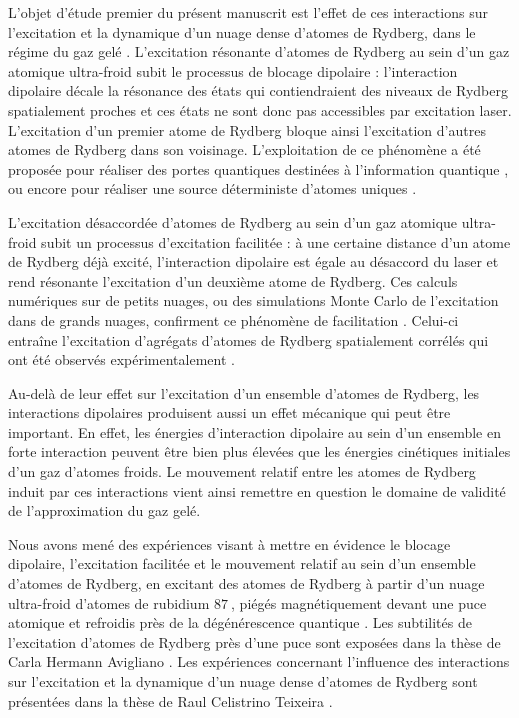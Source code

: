 \bigskip

L'objet d'étude premier du présent manuscrit est l'effet de ces interactions sur l'excitation et la dynamique d'un nuage dense d'atomes de Rydberg, dans le régime du \og gaz gelé \fg{}.
L'excitation résonante d'atomes de Rydberg au sein d'un gaz atomique ultra-froid subit le processus de \og blocage dipolaire \fg{} \cite{Lukin2001} :
l'interaction dipolaire décale la résonance des états qui contiendraient des niveaux de Rydberg spatialement proches et ces états ne sont donc pas accessibles par excitation laser.
L'excitation d'un premier atome de Rydberg bloque ainsi l'excitation d'autres atomes de Rydberg dans son voisinage.
L'exploitation de ce phénomène a été proposée pour réaliser des portes quantiques destinées à l'information quantique \cite{Lukin2001,Lukin2000b,Saffman2010}, ou encore pour réaliser une source déterministe d'atomes uniques \cite{Saffman2002}.

L'excitation désaccordée d'atomes de Rydberg au sein d'un gaz atomique ultra-froid subit un processus d'\og excitation facilitée \fg{} :
à une certaine distance d'un atome de Rydberg déjà excité, l'interaction dipolaire est égale au désaccord du laser et rend résonante l'excitation d'un deuxième atome de Rydberg.
Ces calculs numériques sur de petits nuages, ou des simulations Monte Carlo de l'excitation dans de grands nuages, confirment ce phénomène de facilitation \cite{Robicheaux2005,Rost2007a,Evers2013,Cote2010}.
Celui-ci entraîne l'excitation d'agrégats d'atomes de Rydberg spatialement corrélés qui ont été observés expérimentalement \cite{Weidemueller2013,Pillet2012}.

Au-delà de leur effet sur l'excitation d'un ensemble d'atomes de Rydberg, les interactions dipolaires produisent aussi un effet mécanique qui peut être important.
En effet, les énergies d'interaction dipolaire au sein d'un ensemble en forte interaction peuvent être bien plus élevées que les énergies cinétiques initiales d'un gaz d'atomes froids.
Le mouvement relatif entre les atomes de Rydberg induit par ces interactions vient ainsi remettre en question le domaine de validité de l'approximation du gaz gelé.

Nous avons mené des expériences visant à mettre en évidence le blocage dipolaire, l'excitation facilitée et le mouvement relatif au sein d'un ensemble d'atomes de Rydberg, en excitant des atomes de Rydberg à partir d'un nuage ultra-froid d'atomes de rubidium $\SI{87}{}$, piégés magnétiquement devant une puce atomique et refroidis près de la dégénérescence quantique \cite{ENS_CHIPSPECTRO14,ENS_CHIPINTERACTION15}.
Les subtilités de l'excitation d'atomes de Rydberg près d'une puce sont exposées dans la thèse de Carla Hermann Avigliano \cite{PHD_HERMANN}.
Les expériences concernant l'influence des interactions sur l'excitation et la dynamique d'un nuage dense d'atomes de Rydberg sont présentées dans la thèse de Raul Celistrino Teixeira \cite{PHD_CELISTRINO}.

